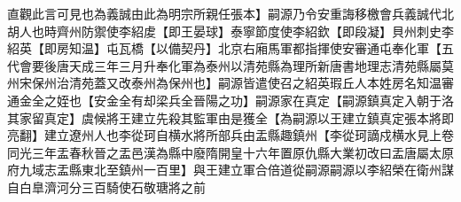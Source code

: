 直觀此言可見也為義誠由此為明宗所親任張本】嗣源乃令安重誨移檄會兵義誠代北胡人也時齊州防禦使李紹䖍【即王晏球】泰寧節度使李紹欽【即段凝】貝州刺史李紹英【即房知温】屯瓦橋【以備契丹】北京右廂馬軍都指揮使安審通屯奉化軍【五代會要後唐天成三年三月升奉化軍為泰州以清苑縣為理所新唐書地理志清苑縣屬莫州宋保州治清苑蓋又改泰州為保州也】嗣源皆遣使召之紹英瑕丘人本姓房名知温審通金全之姪也【安金全有却梁兵全晉陽之功】嗣源家在真定【嗣源鎮真定入朝于洛其家留真定】虞候將王建立先殺其監軍由是獲全【為嗣源以王建立鎮真定張本將即亮翻】建立遼州人也李從珂自横水將所部兵由盂縣趣鎮州【李從珂謫戍横水見上卷同光三年盂春秋晉之盂邑漢為縣中廢隋開皇十六年置原仇縣大業初改曰盂唐屬太原府九域志盂縣東北至鎮州一百里】與王建立軍合倍道從嗣源嗣源以李紹榮在衛州謀自白臯濟河分三百騎使石敬瑭將之前